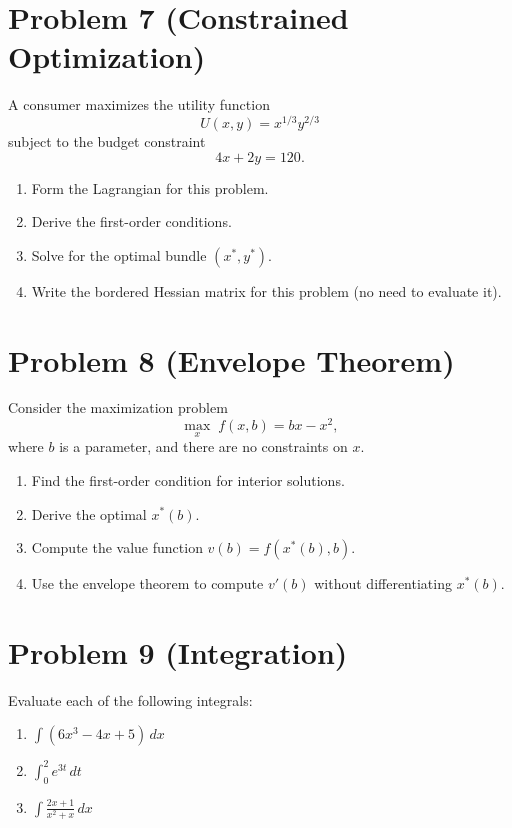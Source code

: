 \documentclass[12pt]{article}
\begin{document}
\section*{Problem 7 (Constrained Optimization)}

A consumer maximizes the utility function
\[
U(x,y)=x^{1/3} y^{2/3}
\]
subject to the budget constraint
\[
4x + 2y = 120.
\]

\begin{enumerate}
    \item Form the Lagrangian for this problem.
    \item Derive the first-order conditions.
    \item Solve for the optimal bundle \((x^\ast, y^\ast)\).
    \item Write the bordered Hessian matrix for this problem (no need to evaluate it).
\end{enumerate}


\newpage
\section*{Problem 8 (Envelope Theorem)}

Consider the maximization problem
\[
\max_{x} \; f(x,b)=bx - x^2,
\]
where \(b\) is a parameter, and there are no constraints on \(x\).

\begin{enumerate}
    \item Find the first-order condition for interior solutions.
    \item Derive the optimal \(x^\ast(b)\).
    \item Compute the value function \(v(b) = f(x^\ast(b), b)\).
    \item Use the envelope theorem to compute \(v'(b)\) without differentiating \(x^\ast(b)\).
\end{enumerate}


\section*{Problem 9 (Integration)}

Evaluate each of the following integrals:

\begin{enumerate}
    \item \(\displaystyle \int (6x^3 - 4x + 5)\, dx\)
    \item \(\displaystyle \int_0^2 e^{3t}\, dt\)
    \item \(\displaystyle \int \frac{2x + 1}{x^2 + x}\, dx\)
\end{enumerate}
\end{document}
